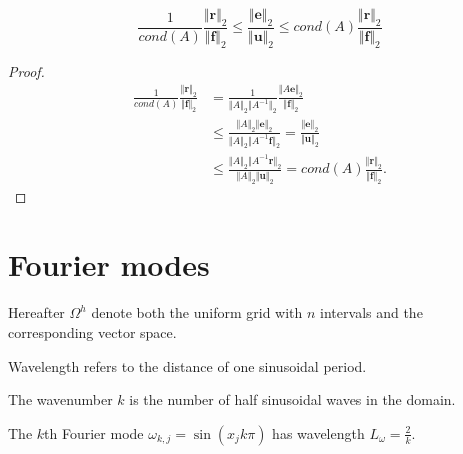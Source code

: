 
\begin{thm}
  \begin{equation}
    \frac{1}{cond(A)}\frac{\Vert\mathbf{r}\Vert_2}{\Vert
      \mathbf{f}\Vert_2}
    \leq \frac{\Vert\mathbf{e}\Vert_2}{\Vert
      \mathbf{u}\Vert_2}
    \leq cond(A)\frac{\Vert\mathbf{r}\Vert_2}{\Vert
      \mathbf{f}\Vert_2}
  \end{equation}
\end{thm}
\begin{proof}
  \begin{equation}
    \begin{aligned}
       \frac{1}{cond(A)}\frac{\Vert\mathbf{r}\Vert_2}{\Vert
         \mathbf{f}\Vert_2}
       &=  \frac{1}{\Vert A\Vert_2\Vert A^{-1}\Vert_2}
       \frac{\Vert A\mathbf{e}\Vert_2}{\Vert
         \mathbf{f}\Vert_2}\\
       &\leq  \frac{\Vert A\Vert_2\Vert \mathbf{e}\Vert_2}
       {\Vert A\Vert_2\Vert A^{-1}\mathbf{f}\Vert_2}
       =\frac{\Vert\mathbf{e}\Vert_2}{\Vert
         \mathbf{u}\Vert_2}\\
       &\leq \frac{\Vert A\Vert_2\Vert A^{-1}\mathbf{r}\Vert_2}
       {\Vert A\Vert_2\Vert
         \mathbf{u}\Vert_2}=
       cond(A)\frac{\Vert\mathbf{r}\Vert_2}{\Vert
      \mathbf{f}\Vert_2}.
    \end{aligned}
  \end{equation}
\end{proof}

\section{Fourier modes}

\begin{ntn}
  Hereafter $\Omega^h$ denote both the uniform grid with $n$ intervals
  and the corresponding vector space.

  Wavelength refers to the distance of one sinusoidal period.

  The wavenumber $k$ is the number of half sinusoidal waves in the domain.
\end{ntn}

\begin{prop}
  The $k$th Fourier mode $\omega_{k,j}=\sin(x_jk\pi)$
  has wavelength $L_{\omega}=\frac{2}{k}.$
\end{prop}


